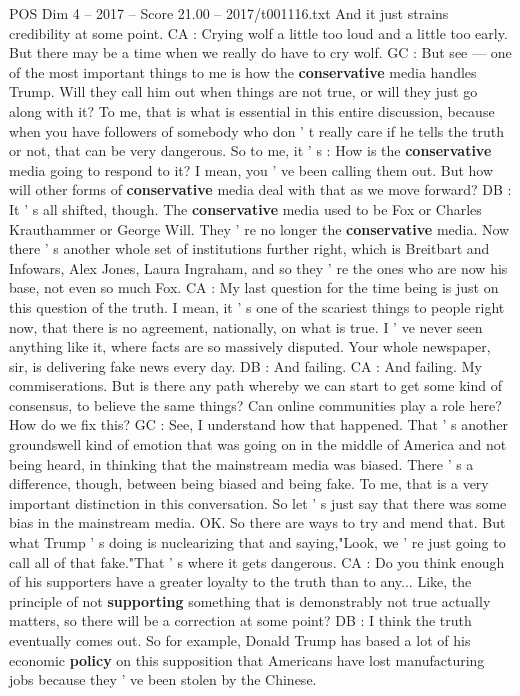 \begin{textsample}{POS Dim 4 – 2017 – Score 21.00 – 2017/t001116.txt}
And it just strains credibility at some point.
CA : Crying wolf a little too loud and a little too early.
But there may be a time when we really do have to cry wolf.
GC : But see — one of the most important things to me is how the \textbf{conservative} media handles Trump.
Will they call him out when things are not true, or will they just go along with it?
To me, that is what is essential in this entire discussion, because when you have followers of somebody who don ' t really care if he tells the truth or not, that can be very dangerous.
So to me, it ' s : How is the \textbf{conservative} media going to respond to it?
I mean, you ' ve been calling them out.
But how will other forms of \textbf{conservative} media deal with that as we move forward?
DB : It ' s all shifted, though.
The \textbf{conservative} media used to be Fox or Charles Krauthammer or George Will.
They ' re no longer the \textbf{conservative} media.
Now there ' s another whole set of institutions further right, which is Breitbart and Infowars, Alex Jones, Laura Ingraham, and so they ' re the ones who are now his base, not even so much Fox.
CA : My last question for the time being is just on this question of the truth.
I mean, it ' s one of the scariest things to people right now, that there is no agreement, nationally, on what is true.
I ' ve never seen anything like it, where facts are so massively disputed.
Your whole newspaper, sir, is delivering fake news every day.
DB : And failing.
CA : And failing.
My commiserations.
But is there any path whereby we can start to get some kind of consensus, to believe the same things?
Can online communities play a role here?
How do we fix this?
GC : See, I understand how that happened.
That ' s another groundswell kind of emotion that was going on in the middle of America and not being heard, in thinking that the mainstream media was biased.
There ' s a difference, though, between being biased and being fake.
To me, that is a very important distinction in this conversation.
So let ' s just say that there was some bias in the mainstream media.
OK.
So there are ways to try and mend that.
But what Trump ' s doing is nuclearizing that and saying,"Look, we ' re just going to call all of that fake."That ' s where it gets dangerous.
CA : Do you think enough of his supporters have a greater loyalty to the truth than to any...
Like, the principle of not \textbf{supporting} something that is demonstrably not true actually matters, so there will be a correction at some point?
DB : I think the truth eventually comes out.
So for example, Donald Trump has based a lot of his economic \textbf{policy} on this supposition that Americans have lost manufacturing jobs because they ' ve been stolen by the Chinese.

\end{textsample}
